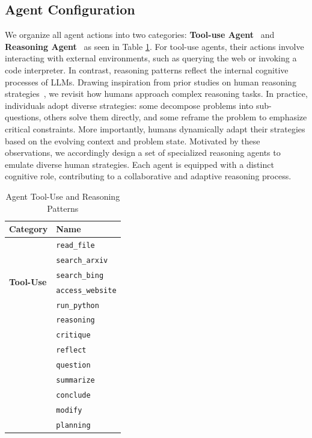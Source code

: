 \documentclass{article}
\begin{document}
\subsection{Agent Configuration}
We organize all agent actions into two categories: \textbf{Tool-use Agent}~\cite{qin2023toolllm, zhuang2024toolchain,schick2023toolformer} and \textbf{Reasoning Agent}~\cite{hao2023reasoninglanguagemodelplanning, qi2024mutualreasoningmakessmaller} as seen in Table \ref{agent_config}. For tool-use agents, their actions involve interacting with external environments, such as querying the web or invoking a code interpreter. In contrast, reasoning patterns reflect the internal cognitive processes of LLMs. Drawing inspiration from prior studies on human reasoning strategies~\cite{qi2024mutualreasoningmakessmaller, chen2024alphamathzeroprocesssupervision, kang2024mindstarenhancingmathreasoning, hao2023reasoninglanguagemodelplanning}, we revisit how humans approach complex reasoning tasks. In practice, individuals adopt diverse strategies: some decompose problems into sub-questions, others solve them directly, and some reframe the problem to emphasize critical constraints. More importantly, humans dynamically adapt their strategies based on the evolving context and problem state. Motivated by these observations, we accordingly design a set of specialized reasoning agents to emulate diverse human strategies. Each agent is equipped with a distinct cognitive role, contributing to a collaborative and adaptive reasoning process.

\begin{table}[htbp]
    \centering
    \caption{Agent Tool-Use and Reasoning Patterns}
    \label{tab:tools_reasoning}
    \begin{tabular}{ll}
        \toprule
        \textbf{Category} & \textbf{Name} \\
        \midrule
        \multirow{6}{*}{\textbf{Tool-Use}} 
            & \texttt{read\_file} \\
            & \texttt{search\_arxiv} \\
            & \texttt{search\_bing} \\
            & \texttt{access\_website} \\
            & \texttt{run\_python} \\
        \midrule
        \multirow{8}{*}{\textbf{Reasoning Patterns}} 
            & \texttt{reasoning} \\
            & \texttt{critique} \\
            & \texttt{reflect} \\
            & \texttt{question} \\
            & \texttt{summarize} \\
            & \texttt{conclude} \\
            & \texttt{modify} \\
             & \texttt{planning} \\
        \bottomrule
    \end{tabular}
    \label{agent_config}
\end{table}
\end{document}
